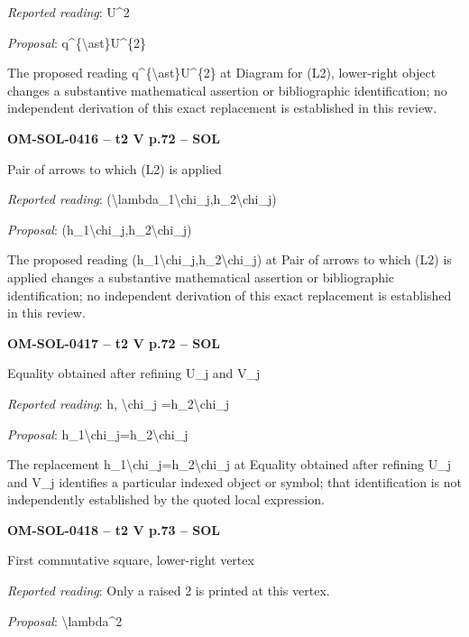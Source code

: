 \emph{Reported reading}: U\textasciicircum{}2\par
\emph{Proposal}: q\textasciicircum{}\{\textbackslash{}ast\}U\textasciicircum{}\{2\}\par
The proposed reading q\textasciicircum{}\{\textbackslash{}ast\}U\textasciicircum{}\{2\} at Diagram for (L2), lower-right object changes a substantive mathematical assertion or bibliographic identification; no independent derivation of this exact replacement is established in this review.\par
\par\noindent\textbf{OM-SOL-0416 -- t2 V p.72 -- SOL}\par
Pair of arrows to which (L2) is applied\par
\emph{Reported reading}: (\textbackslash{}lambda\_1\textbackslash{}chi\_j,h\_2\textbackslash{}chi\_j)\par
\emph{Proposal}: (h\_1\textbackslash{}chi\_j,h\_2\textbackslash{}chi\_j)\par
The proposed reading (h\_1\textbackslash{}chi\_j,h\_2\textbackslash{}chi\_j) at Pair of arrows to which (L2) is applied changes a substantive mathematical assertion or bibliographic identification; no independent derivation of this exact replacement is established in this review.\par
\par\noindent\textbf{OM-SOL-0417 -- t2 V p.72 -- SOL}\par
Equality obtained after refining U\_j and V\_j\par
\emph{Reported reading}: h, \textbackslash{}chi\_j =\allowbreak  h\_2\textbackslash{}chi\_j\par
\emph{Proposal}: h\_1\textbackslash{}chi\_j=\allowbreak h\_2\textbackslash{}chi\_j\par
The replacement h\_1\textbackslash{}chi\_j=\allowbreak h\_2\textbackslash{}chi\_j at Equality obtained after refining U\_j and V\_j identifies a particular indexed object or symbol; that identification is not independently established by the quoted local expression.\par
\par\noindent\textbf{OM-SOL-0418 -- t2 V p.73 -- SOL}\par
First commutative square, lower-right vertex\par
\emph{Reported reading}: Only a raised 2 is printed at this vertex.\par
\emph{Proposal}: \textbackslash{}lambda\textasciicircum{}2\par
